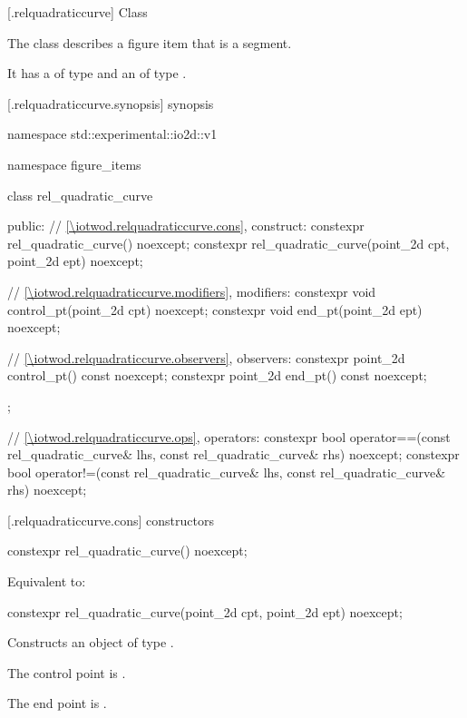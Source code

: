  [\iotwod.relquadraticcurve] {Class }

\pnum
{}%
The class  describes a figure item that is a segment.

\pnum
It has a  of type  and an  of type .

 [\iotwod.relquadraticcurve.synopsis] { synopsis}

\begin{codeblock}
namespace std::experimental::io2d::v1 {
  namespace figure_items {
    class rel_quadratic_curve {
    public:
      // \ref{\iotwod.relquadraticcurve.cons}, construct:
      constexpr rel_quadratic_curve() noexcept;
      constexpr rel_quadratic_curve(point_2d cpt, point_2d ept)
        noexcept;

      // \ref{\iotwod.relquadraticcurve.modifiers}, modifiers:
      constexpr void control_pt(point_2d cpt) noexcept;
      constexpr void end_pt(point_2d ept) noexcept;

      // \ref{\iotwod.relquadraticcurve.observers}, observers:
      constexpr point_2d control_pt() const noexcept;
      constexpr point_2d end_pt() const noexcept;
    };
    
    // \ref{\iotwod.relquadraticcurve.ops}, operators:
    constexpr bool operator==(const rel_quadratic_curve& lhs,
      const rel_quadratic_curve& rhs) noexcept;
    constexpr bool operator!=(const rel_quadratic_curve& lhs,
      const rel_quadratic_curve& rhs) noexcept;
  }
}
\end{codeblock}

 [\iotwod.relquadraticcurve.cons] { constructors}

%
\begin{itemdecl}
constexpr rel_quadratic_curve() noexcept;
\end{itemdecl}
\begin{itemdescr}
\pnum
\effects
Equivalent to: 
\end{itemdescr}

%
\begin{itemdecl}
constexpr rel_quadratic_curve(point_2d cpt, point_2d ept)
  noexcept;
\end{itemdecl}
\begin{itemdescr}
\pnum
\effects
Constructs an object of type .

\pnum
The control point is .

\pnum
The end point is .
\end{itemdescr}

